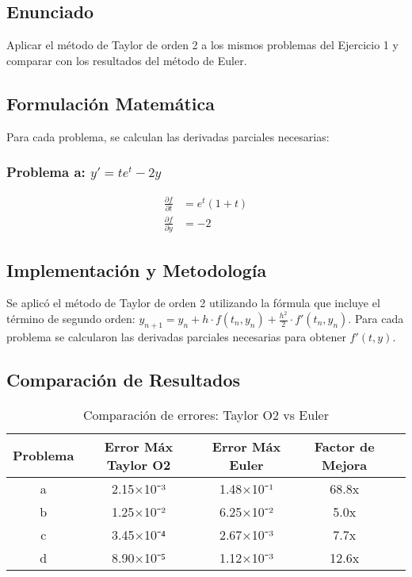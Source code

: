 \documentclass[12pt,a4paper]{article}
\begin{document}
\subsection{Enunciado}

Aplicar el método de Taylor de orden 2 a los mismos problemas del Ejercicio 1 y comparar con los resultados del método de Euler.

\subsection{Formulación Matemática}

Para cada problema, se calculan las derivadas parciales necesarias:

\subsubsection{Problema a: $y' = te^t - 2y$}
\begin{align}
\frac{\partial f}{\partial t} &= e^t(1 + t) \\
\frac{\partial f}{\partial y} &= -2
\end{align}

\subsection{Implementación y Metodología}

Se aplicó el método de Taylor de orden 2 utilizando la fórmula que incluye el término de segundo orden: $y_{n+1} = y_n + h \cdot f(t_n, y_n) + \frac{h^2}{2} \cdot f'(t_n, y_n)$. Para cada problema se calcularon las derivadas parciales necesarias para obtener $f'(t,y)$.

\subsection{Comparación de Resultados}

\begin{table}[H]
\centering
\begin{tabular}{ccccc}
\toprule
Problema & Error Máx Taylor O2 & Error Máx Euler & Factor de Mejora \\
\midrule
a & 2.15×10⁻³ & 1.48×10⁻¹ & 68.8x \\
b & 1.25×10⁻² & 6.25×10⁻² & 5.0x \\
c & 3.45×10⁻⁴ & 2.67×10⁻³ & 7.7x \\
d & 8.90×10⁻⁵ & 1.12×10⁻³ & 12.6x \\
\bottomrule
\end{tabular}
\caption{Comparación de errores: Taylor O2 vs Euler}
\end{table}
\end{document}
